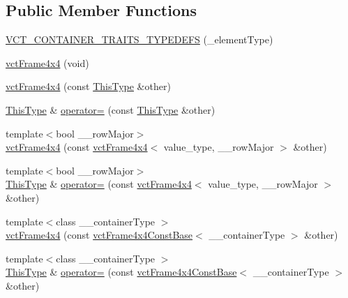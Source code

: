 \subsection*{Public Member Functions}
\begin{DoxyCompactItemize}
\item 
\hyperlink{classvct_frame4x4_a9c3c04d1e23fe869357b974b12f01f65}{V\-C\-T\-\_\-\-C\-O\-N\-T\-A\-I\-N\-E\-R\-\_\-\-T\-R\-A\-I\-T\-S\-\_\-\-T\-Y\-P\-E\-D\-E\-F\-S} (\-\_\-element\-Type)
\item 
\hyperlink{classvct_frame4x4_a8943d78926fcff0830ee33970941fa85}{vct\-Frame4x4} (void)
\item 
\hyperlink{classvct_frame4x4_ab4e2300781ad111c686aee75f167afcc}{vct\-Frame4x4} (const \hyperlink{classvct_fixed_size_const_matrix_base_a7ec66a96ed7e08ce9ff54093133c9d8d}{This\-Type} \&other)
\item 
\hyperlink{classvct_fixed_size_const_matrix_base_a7ec66a96ed7e08ce9ff54093133c9d8d}{This\-Type} \& \hyperlink{classvct_frame4x4_a9fa62beabd6999e4acacb5cc5e492032}{operator=} (const \hyperlink{classvct_fixed_size_const_matrix_base_a7ec66a96ed7e08ce9ff54093133c9d8d}{This\-Type} \&other)
\item 
{\footnotesize template$<$bool \-\_\-\-\_\-row\-Major$>$ }\\\hyperlink{classvct_frame4x4_ad505c1c509931304b74caf2208375b8b}{vct\-Frame4x4} (const \hyperlink{classvct_frame4x4}{vct\-Frame4x4}$<$ value\-\_\-type, \-\_\-\-\_\-row\-Major $>$ \&other)
\item 
{\footnotesize template$<$bool \-\_\-\-\_\-row\-Major$>$ }\\\hyperlink{classvct_fixed_size_const_matrix_base_a7ec66a96ed7e08ce9ff54093133c9d8d}{This\-Type} \& \hyperlink{classvct_frame4x4_aaca53a8203ae39d6cad2dd649737cd21}{operator=} (const \hyperlink{classvct_frame4x4}{vct\-Frame4x4}$<$ value\-\_\-type, \-\_\-\-\_\-row\-Major $>$ \&other)
\item 
{\footnotesize template$<$class \-\_\-\-\_\-container\-Type $>$ }\\\hyperlink{classvct_frame4x4_a87c08f13809f15c709d5c0bcb604b746}{vct\-Frame4x4} (const \hyperlink{classvct_frame4x4_const_base}{vct\-Frame4x4\-Const\-Base}$<$ \-\_\-\-\_\-container\-Type $>$ \&other)
\item 
{\footnotesize template$<$class \-\_\-\-\_\-container\-Type $>$ }\\\hyperlink{classvct_fixed_size_const_matrix_base_a7ec66a96ed7e08ce9ff54093133c9d8d}{This\-Type} \& \hyperlink{classvct_frame4x4_a01ab8db70f4dc199ff0c8fbf75b49d06}{operator=} (const \hyperlink{classvct_frame4x4_const_base}{vct\-Frame4x4\-Const\-Base}$<$ \-\_\-\-\_\-container\-Type $>$ \&other)

\end{DoxyCompactItemize}
